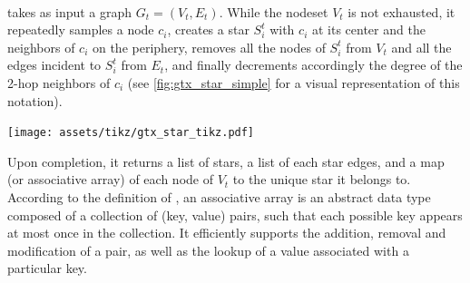 \paragraph{\extractStar{}}\label{par:extractstar}%
\extractStar{} takes as input a graph $G_t=(V_t, E_t)$.
While the nodeset $V_t$ is not exhausted, it repeatedly samples a
node $c_i$, creates a star $S_i^t$ with $c_i$ at its center and the neighbors of $c_i$ on the
periphery, removes all the nodes of $S_i^t$ from
$V_t$ and all the edges incident to $S_i^t$ from $E_t$, and finally decrements accordingly the
degree of the 2-hop neighbors of $c_i$ (see \autoref{fig:gtx_star_simple} for a visual
representation of this notation).
\begin{marginfigure}
  \centering
  \texttt{[image: assets/tikz/gtx\_star\_tikz.pdf]}
  \caption[A sample star]{A sample star created during the \tth{} collapse level. The black node
    is the center $c_i$ of the star $S_i^t$, which is also made of the four light gray peripheral nodes
  as well as the solid edges. The 2-hops neighbors of $c_i$ are the white nodes
  $h_1$ to $h_3$, whose degree will decrease once $S_i^t$ is removed from $G_t$.}
  \label{fig:gtx_star_simple}
\end{marginfigure}%
Upon completion, it returns a list of stars,
a list of each star edges,
and a map (or associative array) of each node of $V_t$ to the unique star it belongs to.
According to the definition of \textcite{HashTableBook08}, an associative array is an abstract data
type composed of a collection of (key, value) pairs, such that each possible key appears at most
once in the collection. It efficiently supports the addition, removal and modification of a pair, as
well as the lookup of a value associated with a particular key.


